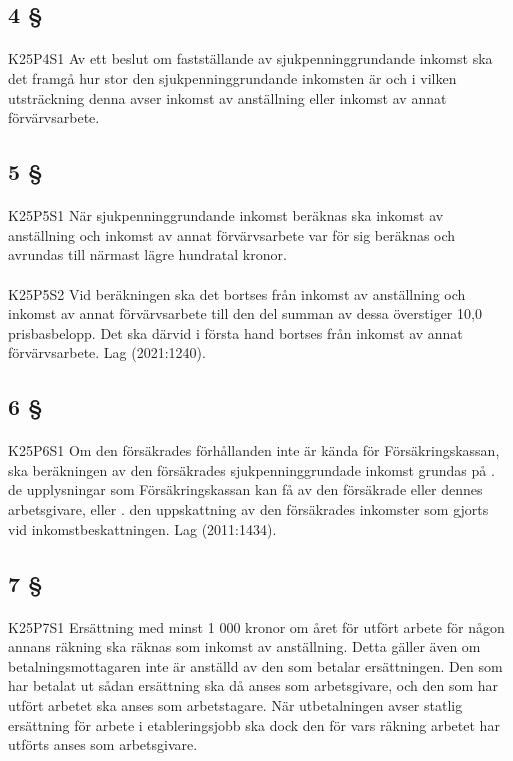 \documentclass[a4paper,notitlepage,openany,10pt]{book}
\begin{document}
\subsection*{4 §}
\paragraph*{}
{\tiny K25P4S1}
Av ett beslut om fastställande av sjukpenninggrundande inkomst ska det framgå hur stor den sjukpenninggrundande inkomsten är och i vilken utsträckning denna avser inkomst av anställning eller inkomst av annat förvärvsarbete.
\subsection*{5 §}
\paragraph*{}
{\tiny K25P5S1}
När sjukpenninggrundande inkomst beräknas ska inkomst av anställning och inkomst av annat förvärvsarbete var för sig beräknas och avrundas till närmast lägre hundratal kronor.
\paragraph*{}
{\tiny K25P5S2}
Vid beräkningen ska det bortses från inkomst av anställning och inkomst av annat förvärvsarbete till den del summan av dessa överstiger 10,0 prisbasbelopp. Det ska därvid i första hand bortses från inkomst av annat förvärvsarbete.
Lag (2021:1240).
\subsection*{6 §}
\paragraph*{}
{\tiny K25P6S1}
Om den försäkrades förhållanden inte är kända för Försäkringskassan, ska beräkningen av den försäkrades sjukpenninggrundade inkomst grundas på
. de upplysningar som Försäkringskassan kan få av den försäkrade eller dennes arbetsgivare, eller
. den uppskattning av den försäkrades inkomster som gjorts vid inkomstbeskattningen.
Lag (2011:1434).
\subsection*{7 §}
\paragraph*{}
{\tiny K25P7S1}
Ersättning med minst 1 000 kronor om året för utfört arbete för någon annans räkning ska räknas som inkomst av anställning. Detta gäller även om betalningsmottagaren inte är anställd av den som betalar ersättningen. Den som har betalat ut sådan ersättning ska då anses som arbetsgivare, och den som har utfört arbetet ska anses som arbetstagare. När utbetalningen avser statlig ersättning för arbete i etableringsjobb ska dock den för vars räkning arbetet har utförts anses som arbetsgivare.
\end{document}

